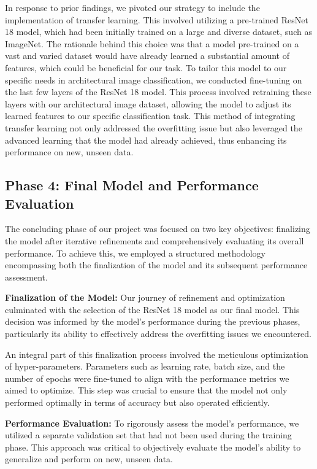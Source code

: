 \documentclass{article}
\begin{document}
In response to prior findings, we pivoted our strategy to include the implementation of transfer learning. This involved utilizing a pre-trained ResNet 18 model, which had been initially trained on a large and diverse dataset, such as ImageNet. The rationale behind this choice was that a model pre-trained on a vast and varied dataset would have already learned a substantial amount of features, which could be beneficial for our task. To tailor this model to our specific needs in architectural image classification, we conducted fine-tuning on the last few layers of the ResNet 18 model. This process involved retraining these layers with our architectural image dataset, allowing the model to adjust its learned features to our specific classification task. This method of integrating transfer learning not only addressed the overfitting issue but also leveraged the advanced learning that the model had already achieved, thus enhancing its performance on new, unseen data.

\subsection{Phase 4: Final Model and Performance Evaluation}

The concluding phase of our project was focused on two key objectives: finalizing the model after iterative refinements and comprehensively evaluating its overall performance. To achieve this, we employed a structured methodology encompassing both the finalization of the model and its subsequent performance assessment.

\textbf{Finalization of the Model:} Our journey of refinement and optimization culminated with the selection of the ResNet 18 model as our final model. This decision was informed by the model's performance during the previous phases, particularly its ability to effectively address the overfitting issues we encountered.

An integral part of this finalization process involved the meticulous optimization of hyper-parameters. Parameters such as learning rate, batch size, and the number of epochs were fine-tuned to align with the performance metrics we aimed to optimize. This step was crucial to ensure that the model not only performed optimally in terms of accuracy but also operated efficiently.

\textbf{Performance Evaluation:} To rigorously assess the model’s performance, we utilized a separate validation set that had not been used during the training phase. This approach was critical to objectively evaluate the model's ability to generalize and perform on new, unseen data.
\end{document}

